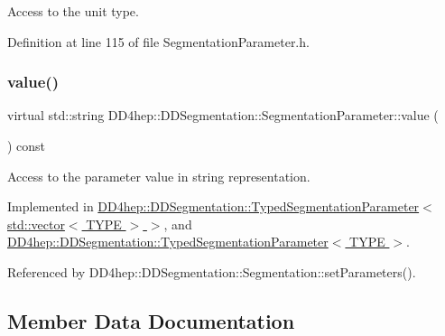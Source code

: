 Access to the unit type. 



Definition at line 115 of file Segmentation\+Parameter.\+h.

\hypertarget{class_d_d4hep_1_1_d_d_segmentation_1_1_segmentation_parameter_a633dffe9e53306c5f67568ff5e567387}{}\label{class_d_d4hep_1_1_d_d_segmentation_1_1_segmentation_parameter_a633dffe9e53306c5f67568ff5e567387} 
\subsubsection{\texorpdfstring{value()}{value()}}
{\footnotesize\ttfamily virtual std\+::string D\+D4hep\+::\+D\+D\+Segmentation\+::\+Segmentation\+Parameter\+::value (\begin{DoxyParamCaption}{ }\end{DoxyParamCaption}) const\hspace{0.3cm}{\ttfamily [pure virtual]}}



Access to the parameter value in string representation. 



Implemented in \hyperlink{class_d_d4hep_1_1_d_d_segmentation_1_1_typed_segmentation_parameter_3_01std_1_1vector_3_01_t_y_p_e_01_4_01_4_a347b2aa67cdbf97444bb0d41d4ab29e9}{D\+D4hep\+::\+D\+D\+Segmentation\+::\+Typed\+Segmentation\+Parameter$<$ std\+::vector$<$ T\+Y\+P\+E $>$ $>$}, and \hyperlink{class_d_d4hep_1_1_d_d_segmentation_1_1_typed_segmentation_parameter_a07802b94c9a0fe56051a70d455d0dd9f}{D\+D4hep\+::\+D\+D\+Segmentation\+::\+Typed\+Segmentation\+Parameter$<$ T\+Y\+P\+E $>$}.



Referenced by D\+D4hep\+::\+D\+D\+Segmentation\+::\+Segmentation\+::set\+Parameters().



\subsection{Member Data Documentation}
\hypertarget{class_d_d4hep_1_1_d_d_segmentation_1_1_segmentation_parameter_a1b798aa8deadc4d66205109cbe6bc120}{}\label{class_d_d4hep_1_1_d_d_segmentation_1_1_segmentation_parameter_a1b798aa8deadc4d66205109cbe6bc120} 
